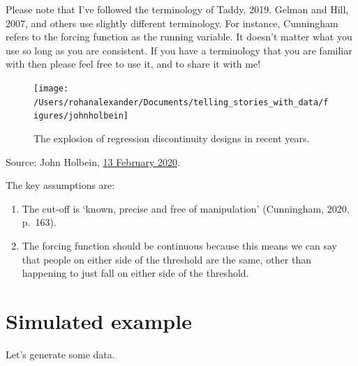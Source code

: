 \documentclass[
]{book}
\providecommand{\tightlist}{%
  \setlength{\itemsep}{0pt}\setlength{\parskip}{0pt}}
\begin{document}
Please note that I've followed the terminology of Taddy, 2019. Gelman and Hill, 2007, and others use slightly different terminology. For instance, Cunningham refers to the forcing function as the running variable. It doesn't matter what you use so long as you are consistent. If you have a terminology that you are familiar with then please feel free to use it, and to share it with me!

\begin{figure}
\texttt{[image: /Users/rohanalexander/Documents/telling\_stories\_with\_data/figures/johnholbein]} \caption{The explosion of regression discontinuity designs in recent years.}\label{fig:johnholbein}
\end{figure}

Source: John Holbein, \href{https://twitter.com/JohnHolbein1/status/1228050675378069504}{13 February 2020}.

The key assumptions are:

\begin{enumerate}
\def\labelenumi{\arabic{enumi}.}
\tightlist
\item
  The cut-off is `known, precise and free of manipulation' (Cunningham, 2020, p.~163).
\item
  The forcing function should be continuous because this means we can say that people on either side of the threshold are the same, other than happening to just fall on either side of the threshold.
\end{enumerate}

\hypertarget{simulated-example-2}{%
\section{Simulated example}\label{simulated-example-2}}

Let's generate some data.
\end{document}
